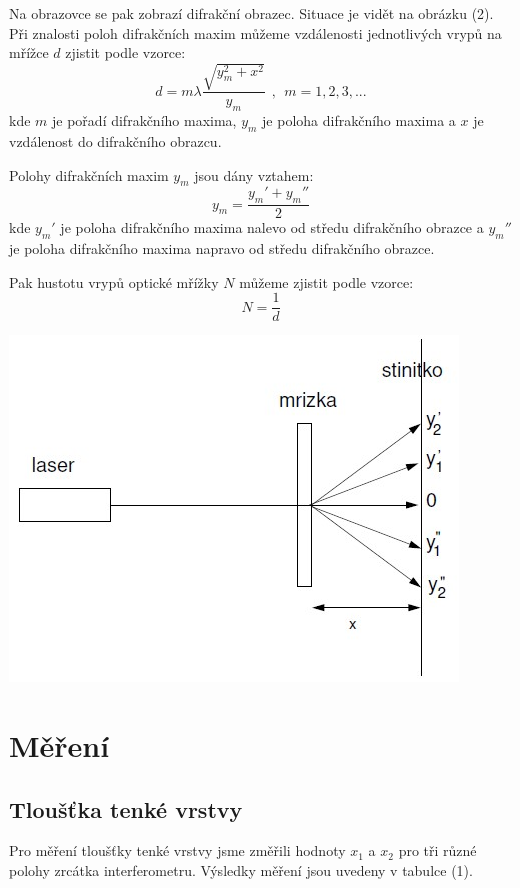 \documentclass[a4paper,11pt]{article}
\begin{document}
\newpage
    \begin{minipage}[t]{0.5\textwidth}
            \par Na obrazovce se pak zobrazí difrakční obrazec. Situace je vidět na obrázku (2). Při znalosti poloh difrakčních maxim můžeme vzdálenosti jednotlivých vrypů na mřížce $d$ zjistit podle vzorce:
            \begin{equation}
                d = m\lambda \frac{\sqrt{y^2_m + x^2}}{y_m} ~~,~~ m = 1, 2, 3, ...
            \end{equation}
            kde $m$ je pořadí difrakčního maxima, $y_m$ je poloha difrakčního maxima a $x$ je vzdálenost do difrakčního obrazcu.
            \par Polohy difrakčních maxim $y_m$ jsou dány vztahem:
            \begin{equation}
                y_m = \frac{y_m'+y_m''}{2}
            \end{equation}
            kde $y_m'$ je poloha difrakčního maxima nalevo od středu difrakčního obrazce a $y_m''$ je poloha difrakčního maxima napravo od středu difrakčního obrazce.
            \par Pak hustotu vrypů optické mřížky $N$ můžeme zjistit podle vzorce:
            \begin{equation}
                N = \frac{1}{d}
            \end{equation}
            \vspace{10pt}   
            \par \centering
            \includegraphics[scale=0.5]{dif}
            \captionsetup{justification=centering, font=footnotesize}
            \label{fig:dif}
            \vspace{10pt}
            \raggedright
    \section{Měření}  
        \subsection{Tloušťka tenké vrstvy}
            Pro měření tloušťky tenké vrstvy jsme změřili hodnoty $x_1$ a $x_2$ pro tři různé polohy zrcátka interferometru. Výsledky měření jsou uvedeny v tabulce (1).
        \end{minipage}
\end{document}
